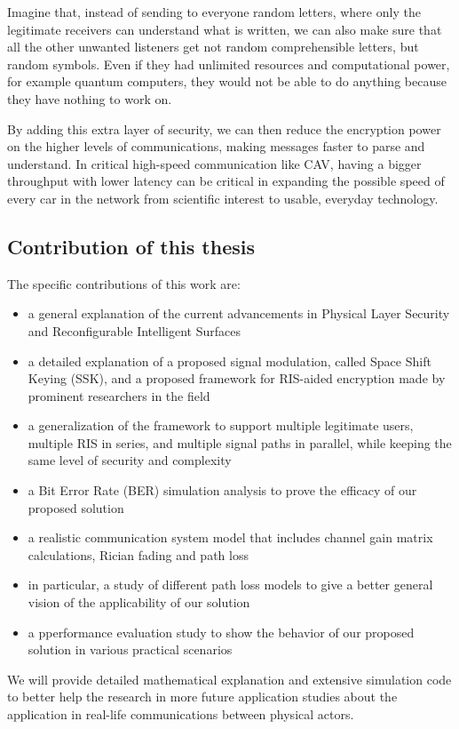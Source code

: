 Imagine that, instead of sending to everyone random letters, where only the legitimate receivers can understand what is written, we can also make sure that all the other unwanted listeners get not random comprehensible letters, but random symbols. Even if they had unlimited resources and computational power, for example quantum computers, they would not be able to do anything because they have nothing to work on.

By adding this extra layer of security, we can then reduce the encryption power on the higher levels of communications, making messages faster to parse and understand. In critical high-speed communication like CAV, having a bigger throughput with lower latency can be critical in expanding the possible speed of every car in the network from scientific interest to usable, everyday technology.

\subsection{Contribution of this thesis}

The specific contributions of this work are:
\begin{itemize}
  \item a general explanation of the current advancements in Physical Layer Security and Reconfigurable Intelligent Surfaces
  \item a detailed explanation of a proposed signal modulation, called Space Shift Keying (SSK), and a proposed framework for RIS-aided encryption made by prominent researchers in the field
  \item a generalization of the framework to support multiple legitimate users, multiple RIS in series, and multiple signal paths in parallel, while keeping the same level of security and complexity
  \item a Bit Error Rate (BER) simulation analysis to prove the efficacy of our proposed solution
  \item a realistic communication system model that includes channel gain matrix calculations, Rician fading and path loss
  \item in particular, a study of different path loss models to give a better general vision of the applicability of our solution
  \item a pperformance evaluation study to show the behavior of our proposed solution in various practical scenarios
\end{itemize}

We will provide detailed mathematical explanation and extensive simulation code to better help the research in more future application studies about the application in real-life communications between physical actors.

